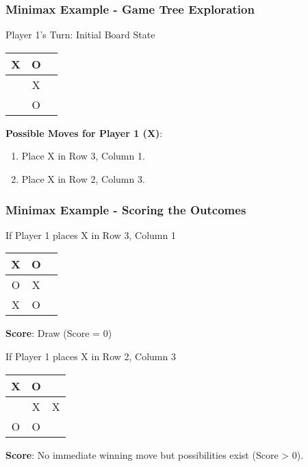 \documentclass[aspectratio=169]{beamer}
\begin{document}
\begin{frame}[fragile]
    \frametitle{Minimax Example - Game Tree Exploration}
    \begin{block}{Player 1's Turn: Initial Board State}
        \begin{center}
            \begin{tabular}{|c|c|c|}
                \hline
                X & O & \\ \hline
                & X & \\ \hline
                & O & \\ \hline
            \end{tabular}
        \end{center}
    \end{block}
    
    \textbf{Possible Moves for Player 1 (X)}:
    \begin{enumerate}
        \item Place X in Row 3, Column 1.
        \item Place X in Row 2, Column 3.
    \end{enumerate}
\end{frame}

\begin{frame}[fragile]
    \frametitle{Minimax Example - Scoring the Outcomes}
    \begin{block}{If Player 1 places X in Row 3, Column 1}
        \begin{center}
            \begin{tabular}{|c|c|c|}
                \hline
                X & O & \\ \hline
                O & X & \\ \hline
                X & O & \\ \hline
            \end{tabular}
        \end{center}
        \textbf{Score}: Draw (Score = 0)
    \end{block}
    
    \begin{block}{If Player 1 places X in Row 2, Column 3}
        \begin{center}
            \begin{tabular}{|c|c|c|}
                \hline
                X & O & \\ \hline
                & X & X \\ \hline
                O & O & \\ \hline
            \end{tabular}
        \end{center}
        \textbf{Score}: No immediate winning move but possibilities exist (Score > 0).
    \end{block}
\end{frame}
\end{document}
